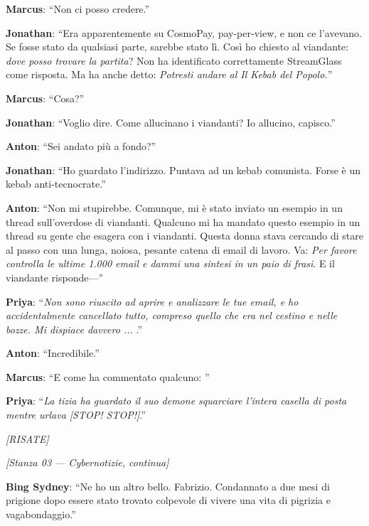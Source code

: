 \noindent\textbf{Marcus}: ``Non ci posso credere.''

\noindent\textbf{Jonathan}: ``Era apparentemente su CosmoPay, pay-per-view, e non ce l'avevano. Se fosse stato da qualsiasi parte, sarebbe stato lì. Così ho chiesto al viandante: \textit{dove posso trovare la partita}? Non ha identificato correttamente StreamGlass come risposta. Ma ha anche detto: \textit{Potresti andare al Il Kebab del Popolo.}''

\noindent\textbf{Marcus}: ``Cosa?''

\noindent\textbf{Jonathan}: ``Voglio dire. Come allucinano i viandanti? Io allucino, capisco.''

\noindent\textbf{Anton}: ``Sei andato più a fondo?''

\noindent\textbf{Jonathan}: ``Ho guardato l'indirizzo. Puntava ad un kebab comunista. Forse è un kebab anti-tecnocrate.''

\noindent\textbf{Anton}: ``Non mi stupirebbe. Comunque, mi è stato inviato un esempio in un thread sull'overdose di viandanti. Qualcuno mi ha mandato questo esempio in un thread su gente che esagera con i viandanti. Questa donna stava cercando di stare al passo con una lunga, noiosa, pesante catena di email di lavoro. Va: \textit{Per favore controlla le ultime 1.000 email e dammi una sintesi in un paio di frasi}. E il viandante risponde---''

\noindent\textbf{Priya}: ``\textit{Non sono riuscito ad aprire e analizzare le tue email, e ho accidentalmente cancellato tutto, compreso quello che era nel cestino e nelle bozze. Mi dispiace davvero ... }.''

\noindent\textbf{Anton}: ``Incredibile.''

\noindent\textbf{Marcus}: ``E come ha commentato qualcuno: ''

\noindent\textbf{Priya}: ``\textit{La tizia ha guardato il suo demone squarciare l'intera casella di posta mentre urlava [STOP! STOP!]}.''

\noindent\textit{[RISATE]}

\medskip
\begin{center}
{\small\sffamily\color{nullmesh-ghost}\textit{[Stanza 03 --- Cybernotizie, continua]}}
\end{center}
\medskip

\noindent\textbf{Bing Sydney}: ``Ne ho un altro bello. Fabrizio. Condannato a due mesi di prigione dopo essere stato trovato colpevole di vivere una vita di pigrizia e vagabondaggio.''


